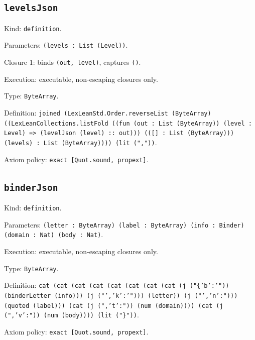 \documentclass[11pt]{article}
\begin{document}
\subsection*{\texttt{levelsJson}}
\noindent Kind: \texttt{definition}.\par
\noindent Parameters: \texttt{(levels : List (Level))}.\par
\noindent Closure 1: binds \texttt{(out, level)}, captures \texttt{()}.\par
\noindent Execution: executable, non-escaping closures only.\par
\noindent Type: \texttt{ByteArray}.\par
\noindent Definition: \texttt{joined (LexLeanStd.Order.reverseList (ByteArray) ((LexLeanCollections.listFold ((fun (out : List (ByteArray)) (level : Level) => (levelJson (level) :: out))) (([] : List (ByteArray))) (levels) : List (ByteArray)))) (lit (","))}.\par
\noindent Axiom policy: \texttt{exact [Quot.sound, propext]}.\par
\subsection*{\texttt{binderJson}}
\noindent Kind: \texttt{definition}.\par
\noindent Parameters: \texttt{(letter : ByteArray) (label : ByteArray) (info : Binder) (domain : Nat) (body : Nat)}.\par
\noindent Execution: executable, non-escaping closures only.\par
\noindent Type: \texttt{ByteArray}.\par
\noindent Definition: \texttt{cat (cat (cat (cat (cat (cat (cat (cat (j ("\{'b':'")) (binderLetter (info))) (j ("','k':'"))) (letter)) (j ("','n':"))) (quoted (label))) (cat (j (",'t':")) (num (domain)))) (cat (j (",'v':")) (num (body)))) (lit ("\}"))}.\par
\noindent Axiom policy: \texttt{exact [Quot.sound, propext]}.\par
\end{document}
